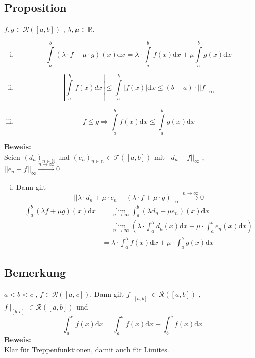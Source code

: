 
\subsection{Proposition} %
\label{sub:proposition}
$f,g \in \mathcal{R}([a,b])$  , $\lambda , \mu \in \mathds{R}$. 
\begin{enumerate}[(i)]
	\item 
	\[
		\int\limits_{a}^{b} \! (\lambda \cdot f + \mu \cdot g)(x)  \mathrm{d}x  = \lambda \cdot \int\limits_{a}^{b} \! f(x)  \mathrm{d}x  
		+ \mu \int\limits_{a}^{b} \! g(x) \mathrm{d}x
	\]
	\item 
	\[
		\left| \int\limits_{a}^{b} \! f(x) dx \right| \le \int\limits_{a}^{b} \! |f(x)|  \mathrm{d}x  \le (b-a) \cdot || f ||_\infty 
	\]
	\item \[
		f \le g \Rightarrow \int\limits_{a}^{b} \! f(x)  \mathrm{d}x  \le \int\limits_{a}^{b} \! g(x)  \mathrm{d}x 
	\]
\end{enumerate} 
\underline{\textbf{Beweis:}} \\
Seien $(d_n)_{n \in \mathds{N}}$ und $(e_n)_{n \in \mathds{N}} \subset \mathcal{T} ([a,b])$ mit $|| d_n -f ||_\infty $ , 
$|| e_n -f ||_\infty  \xrightarrow{n \to \infty} 0$
\begin{enumerate}[(i)]
	\item Dann gilt
	\[
		|| \lambda \cdot d_n + \mu \cdot e_n - (\lambda \cdot f + \mu \cdot g)  ||_\infty  \xrightarrow{n \to \infty} 0
	\]
	\begin{align*}
		\int_{a} ^{b} \! (\lambda f + \mu g)(x)  \mathrm{d}x &= \lim\limits_{n \to \infty} \int_{a} ^{b} \! (\lambda d_n + \mu e_n)(x)  \mathrm{d}x \\
		&= \lim\limits_{n \to \infty} \left( \lambda \cdot \int_{a} ^{b} \! d_n (x)  \mathrm{d}x  + \mu \cdot \int_{a} ^{b} \! e_n (x)  \mathrm{d}x  \right) \\
		&= \lambda \cdot  \int_{a} ^{b} \! f(x)  \mathrm{d}x  + \mu \cdot \int_{a} ^{b} \! g(x)  \mathrm{d}x 
	\end{align*}
\end{enumerate}

\subsection{Bemerkung} %
\label{sub:bemerkung}
$a <b < c$ , $f \in \mathcal{R}([a,c])$.  Dann gilt $f \mid_{[a,b]} \in \mathcal{R} ([a,b]) $ , $f \mid_{[b,c]} \in \mathcal{R} ([a,b]) $ und 
\[
	\int_{a} ^{c} \! f(x)  \mathrm{d}x = \int_{a} ^{b} \! f(x)  \mathrm{d}x + \int_{b} ^{c} \!  f(x)  \mathrm{d}x 
\]
\underline{\textbf{Beweis:}} \\
Klar für Treppenfunktionen, damit auch für Limites. \hfill \( \square \)

